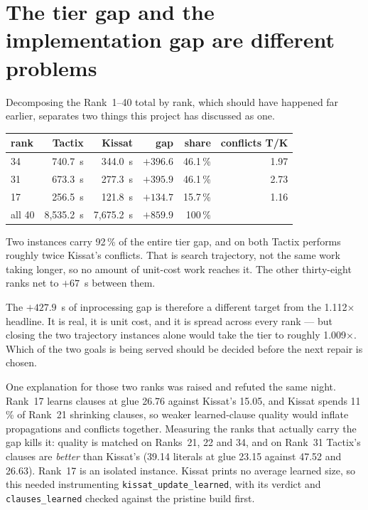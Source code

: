 \documentclass[11pt]{article}
\newcommand{\code}[1]{\texttt{#1}}
\begin{document}
\section{The tier gap and the implementation gap are different problems}

Decomposing the Rank~1--40 total by rank, which should have happened far
earlier, separates two things this project has discussed as one.

\begin{center}
\begin{tabular}{lrrrrr}
\toprule
rank & Tactix & Kissat & gap & share & conflicts T/K \\
\midrule
34 & 740.7~s & 344.0~s & $+396.6$ & 46.1\,\% & 1.97 \\
31 & 673.3~s & 277.3~s & $+395.9$ & 46.1\,\% & 2.73 \\
17 & 256.5~s & 121.8~s & $+134.7$ & 15.7\,\% & 1.16 \\
all 40 & 8{,}535.2~s & 7{,}675.2~s & $+859.9$ & 100\,\% & \\
\bottomrule
\end{tabular}
\end{center}

Two instances carry 92\,\% of the entire tier gap, and on both Tactix
performs roughly twice Kissat's conflicts. That is search trajectory, not
the same work taking longer, so no amount of unit-cost work reaches it.
The other thirty-eight ranks net to $+67$~s between them.

The $+427.9$~s of inprocessing gap is therefore a different target from
the 1.112$\times$ headline. It is real, it is unit cost, and it is spread
across every rank --- but closing the two trajectory instances alone would
take the tier to roughly 1.009$\times$. Which of the two goals is being
served should be decided before the next repair is chosen.

One explanation for those two ranks was raised and refuted the same night.
Rank~17 learns clauses at glue 26.76 against Kissat's 15.05, and Kissat
spends 11\,\% of Rank~21 shrinking clauses, so weaker learned-clause
quality would inflate propagations and conflicts together. Measuring the
ranks that actually carry the gap kills it: quality is matched on
Ranks~21, 22 and 34, and on Rank~31 Tactix's clauses are \emph{better}
than Kissat's (39.14 literals at glue 23.15 against 47.52 and 26.63).
Rank~17 is an isolated instance. Kissat prints no average learned size, so
this needed instrumenting \code{kissat\_update\_learned}, with its verdict
and \code{clauses\_learned} checked against the pristine build first.
\end{document}
